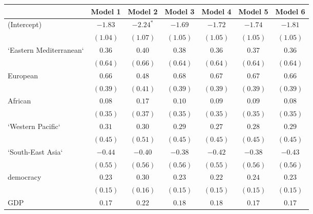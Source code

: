 
\begin{table}[!h]
\begin{center}
\begin{tabular}{l c c c c c c }
\toprule
 & Model 1 & Model 2 & Model 3 & Model 4 & Model 5 & Model 6 \\
\midrule
(Intercept)             & $-1.83$      & $-2.24^{*}$  & $-1.69$      & $-1.72$      & $-1.74$      & $-1.81$      \\
                        & $(1.04)$     & $(1.07)$     & $(1.05)$     & $(1.05)$     & $(1.05)$     & $(1.05)$     \\
`Eastern Mediterranean` & $0.36$       & $0.40$       & $0.38$       & $0.36$       & $0.37$       & $0.36$       \\
                        & $(0.64)$     & $(0.66)$     & $(0.64)$     & $(0.64)$     & $(0.64)$     & $(0.64)$     \\
European                & $0.66$       & $0.48$       & $0.68$       & $0.67$       & $0.67$       & $0.66$       \\
                        & $(0.39)$     & $(0.41)$     & $(0.39)$     & $(0.39)$     & $(0.39)$     & $(0.39)$     \\
African                 & $0.08$       & $0.17$       & $0.10$       & $0.09$       & $0.09$       & $0.08$       \\
                        & $(0.35)$     & $(0.37)$     & $(0.35)$     & $(0.35)$     & $(0.35)$     & $(0.35)$     \\
`Western Pacific`       & $0.31$       & $0.30$       & $0.29$       & $0.27$       & $0.28$       & $0.29$       \\
                        & $(0.45)$     & $(0.51)$     & $(0.45)$     & $(0.45)$     & $(0.45)$     & $(0.45)$     \\
`South-East Asia`       & $-0.44$      & $-0.40$      & $-0.38$      & $-0.42$      & $-0.38$      & $-0.43$      \\
                        & $(0.55)$     & $(0.56)$     & $(0.56)$     & $(0.55)$     & $(0.56)$     & $(0.56)$     \\
democracy               & $0.23$       & $0.30$       & $0.23$       & $0.22$       & $0.24$       & $0.23$       \\
                        & $(0.15)$     & $(0.16)$     & $(0.15)$     & $(0.15)$     & $(0.15)$     & $(0.15)$     \\
GDP                     & $0.17$       & $0.22$       & $0.18$       & $0.18$       & $0.17$       & $0.17$       \\

\end{tabular}
\end{center}
\end{table}
